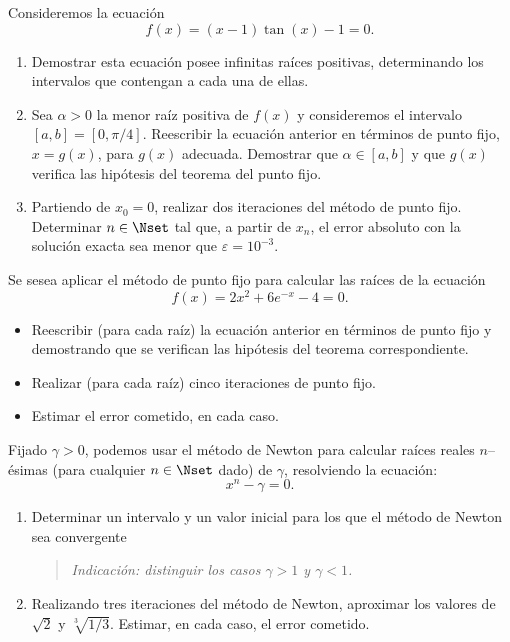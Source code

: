 \documentclass[11pt]{article}
\begin{document}
\begin{problemas}
   \begin{problema}
     Consideremos la ecuación $$f(x)=(x-1)\tan(x)-1=0.$$
     \begin{enumerate}
     \item Demostrar esta ecuación posee infinitas raíces positivas,
       determinando los intervalos que contengan a cada una de ellas.
     \item Sea $\alpha>0$ la menor raíz positiva de $f(x)$ y
       consideremos el intervalo $[a,b]=[0,\pi/4]$. Reescribir la
       ecuación anterior en términos de punto fijo, $x=g(x)$, para 
       $g(x)$ adecuada. Demostrar que $\alpha\in [a,b]$ y que $g(x)$
       verifica las hipótesis del teorema del punto fijo.
     \item Partiendo de $x_0=0$, realizar dos iteraciones del método
       de punto fijo. Determinar $n\in\Nset$ tal que, a partir de
       $x_n$, el error absoluto con la solución exacta sea menor que
       $\varepsilon = 10^{-3}$.
     \end{enumerate}
   \end{problema}

   \begin{problema}
     Se sesea aplicar el método de punto fijo para calcular las raíces
     de la ecuación
     $$
     f(x)=2x^2+6e^{-x}-4=0.
     $$
     \begin{itemize}
     \item Reescribir (para cada raíz) la ecuación anterior en términos
       de punto fijo y demostrando que se verifican las hipótesis del
       teorema correspondiente.
     \item Realizar (para cada raíz) cinco iteraciones de punto fijo.
     \item Estimar el error cometido, en cada caso.
     \end{itemize}
   \end{problema}

   \begin{problema}
     Fijado $\gamma>0$, podemos usar el método de Newton para calcular
     raíces reales $n$--ésimas (para cualquier $n\in\Nset$ dado)
     de $\gamma$, resolviendo la ecuación:
     $$
     x^n - \gamma = 0.
     $$
     \begin{enumerate}
     \item Determinar un intervalo y un valor inicial para los que el
       método de Newton sea convergente
       \begin{quote}\em\small
         Indicación: distinguir los casos $\gamma>1$ y $\gamma<1$.
       \end{quote}
     \item Realizando tres iteraciones del método de Newton, aproximar
       los valores de $\sqrt{2}$ y $\sqrt[3]{1/3}$. Estimar, en cada
       caso, el error cometido.
     \end{enumerate}
     

\end{problema}
\end{problemas}
\end{document}

